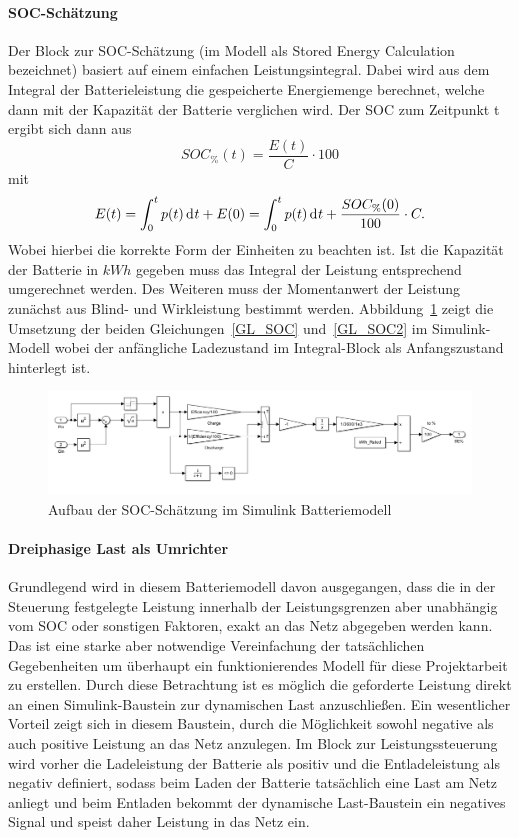 \paragraph{SOC-Schätzung}
Der Block zur SOC-Schätzung (im Modell als Stored Energy Calculation bezeichnet) basiert auf einem einfachen Leistungsintegral.
Dabei wird aus dem Integral der Batterieleistung die gespeicherte Energiemenge berechnet, welche dann mit der Kapazität der Batterie verglichen wird.
Der SOC zum Zeitpunkt t ergibt sich dann aus
\begin{equation}\label{GL_SOC}
	SOC_{\%}(t) = \frac{E(t)}{C} \cdot 100
\end{equation}
mit
\begin{equation}\label{GL_SOC2}
	E(t) = \int_{0}^{t}p(t) \diff t + E(0) = \int_{0}^{t}p(t) \diff t + \frac{SOC_{\%}(0)}{100}\cdot C.
\end{equation}
Wobei hierbei die korrekte Form der Einheiten zu beachten ist.
Ist die Kapazität der Batterie in $kWh$ gegeben muss das Integral der Leistung entsprechend umgerechnet werden.
Des Weiteren muss der Momentanwert der Leistung zunächst aus Blind- und Wirkleistung bestimmt werden.
Abbildung~\ref{SOC} zeigt die Umsetzung der beiden Gleichungen~\ref{GL_SOC} und~\ref{GL_SOC2} im Simulink-Modell 
wobei der anfängliche Ladezustand im Integral-Block als Anfangszustand hinterlegt ist.
\begin{figure}[h!]
	\centering
	\includegraphics[width=12cm]{Abbildungen/SOC.png}
	\caption{Aufbau der SOC-Schätzung im Simulink Batteriemodell}\label{SOC}
\end{figure}

\paragraph{Dreiphasige Last als Umrichter}
Grundlegend wird in diesem Batteriemodell davon ausgegangen, dass die in der Steuerung festgelegte Leistung
innerhalb der Leistungsgrenzen aber unabhängig vom SOC oder sonstigen Faktoren, exakt an das Netz abgegeben werden kann.
Das ist eine starke aber notwendige Vereinfachung der tatsächlichen Gegebenheiten um überhaupt ein funktionierendes Modell
für diese Projektarbeit zu erstellen.
Durch diese Betrachtung ist es möglich die geforderte Leistung direkt an einen Simulink-Baustein zur dynamischen Last
anzuschließen. 
Ein wesentlicher Vorteil zeigt sich in diesem Baustein, durch die Möglichkeit sowohl negative als auch positive Leistung
an das Netz anzulegen.
Im Block zur Leistungssteuerung wird vorher die Ladeleistung der Batterie als positiv und die Entladeleistung als negativ definiert,
sodass beim Laden der Batterie tatsächlich eine Last am Netz anliegt und beim Entladen bekommt der dynamische Last-Baustein
ein negatives Signal und speist daher Leistung in das Netz ein.


